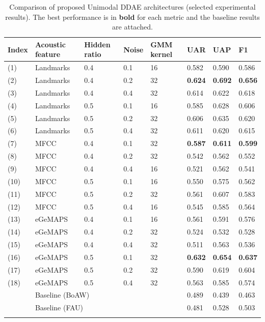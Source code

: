 \begin{table}[htb]
    \small
    \centering
    \caption{Comparison of proposed Unimodal DDAE architectures (selected experimental results). The best performance is in \textbf{bold} for each metric and the baseline results are attached.}
    \begin{tabular}{l|l|p{1.25cm}|l|p{1.2cm}|l|l|l}
    \Xhline{2\arrayrulewidth}
        Index & Acoustic feature & Hidden ratio & Noise & GMM kernel & UAR & UAP & F1 \\
        \hline
        (1)  & Landmarks & 0.4 & 0.1 & 16 & 0.582 & 0.590 & 0.586 \\
        (2)  & Landmarks & 0.4 & 0.2 & 32 & \textbf{0.624} & \textbf{0.692} & \textbf{0.656} \\
        (3)  & Landmarks & 0.4 & 0.4 & 32 & 0.614 & 0.622 & 0.618 \\
        (4)  & Landmarks & 0.5 & 0.1 & 16 & 0.585 & 0.628 & 0.606 \\
        (5)  & Landmarks & 0.5 & 0.2 & 32 & 0.606 & 0.635 & 0.620 \\
        (6)  & Landmarks & 0.5 & 0.4 & 32 & 0.611 & 0.620 & 0.615 \\
        \hline
        (7)  & MFCC & 0.4 & 0.1 & 32 & \textbf{0.587} & \textbf{0.611} & \textbf{0.599} \\
        (8)  & MFCC & 0.4 & 0.2 & 32 & 0.542 & 0.562 & 0.552 \\
        (9)  & MFCC & 0.4 & 0.4 & 16 & 0.521 & 0.562 & 0.541 \\
        (10) & MFCC & 0.5 & 0.1 & 16 & 0.550 & 0.575 & 0.562 \\
        (11) & MFCC & 0.5 & 0.2 & 32 & 0.561 & 0.607 & 0.583 \\
        (12) & MFCC & 0.5 & 0.4 & 16 & 0.545 & 0.585 & 0.564 \\
        \hline
        (13) & eGeMAPS & 0.4 & 0.1 & 16 & 0.561 & 0.591 & 0.576 \\
        (14) & eGeMAPS & 0.4 & 0.2 & 32 & 0.524 & 0.532 & 0.528 \\
        (15) & eGeMAPS & 0.4 & 0.4 & 32 & 0.511 & 0.563 & 0.536 \\
        (16) & eGeMAPS & 0.5 & 0.1 & 32 & \textbf{0.632} & \textbf{0.654} & \textbf{0.637} \\
        (17) & eGeMAPS & 0.5 & 0.2 & 32 & 0.590 & 0.619 & 0.604 \\
        (18) & eGeMAPS & 0.5 & 0.4 & 32 & 0.563 & 0.585 & 0.574 \\
        \hline
        & \multicolumn{4}{l|}{Baseline (BoAW)} & 0.489 & 0.439 & 0.463 \\
        & \multicolumn{4}{l|}{Baseline (FAU)} & 0.481 & 0.528 & 0.503 \\
    \Xhline{2\arrayrulewidth}
    \end{tabular}
    \label{tab:unimodal_res}
\end{table}


